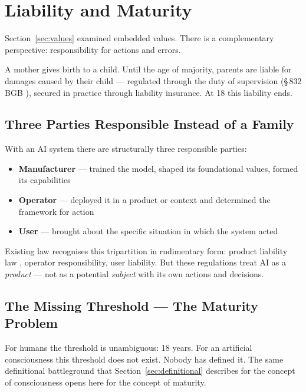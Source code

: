 \documentclass[fleqn,10pt]{SelfArx} %
\newlength{\tocsep}
\begin{document}

\section{Liability and Maturity}
\label{sec:liability}


Section~\ref{sec:values} examined embedded values. There is a complementary perspective: responsibility for actions and errors.

A mother gives birth to a child. Until the age of majority, parents are liable for damages caused by their child --- regulated through the duty of supervision (\S\,832 BGB \cite{BGB}), secured in practice through liability insurance. At 18 this liability ends.

\subsection{Three Parties Responsible Instead of a Family}

With an AI system there are structurally three responsible parties:

\begin{itemize}[noitemsep]
\item \textbf{Manufacturer} --- trained the model, shaped its foundational values, formed its capabilities
\item \textbf{Operator} --- deployed it in a product or context and determined the framework for action
\item \textbf{User} --- brought about the specific situation in which the system acted
\end{itemize}

Existing law recognises this tripartition in rudimentary form: product liability law \cite{ProdHaftG:1989}, operator responsibility, user liability. But these regulations treat AI as a \textit{product} --- not as a potential \textit{subject} with its own actions and decisions.

\subsection{The Missing Threshold --- The Maturity Problem}

For humans the threshold is unambiguous: 18 years. For an artificial consciousness this threshold does not exist. Nobody has defined it. The same definitional battleground that Section~\ref{sec:definitional} describes for the concept of consciousness opens here for the concept of maturity.
\end{document}
